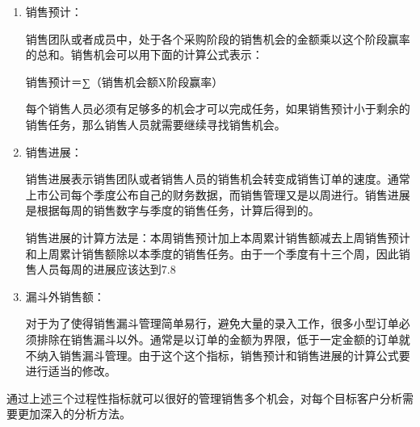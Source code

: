     \begin{enumerate}
        \item 销售预计：

        销售团队或者成员中，处于各个采购阶段的销售机会的金额乘以这个阶段赢率的总和。销售机会可以用下面的计算公式表示：

        销售预计＝∑（销售机会额X阶段赢率）

        每个销售人员必须有足够多的机会才可以完成任务，如果销售预计小于剩余的销售任务，那么销售人员就需要继续寻找销售机会。

        \item 销售进展：

        销售进展表示销售团队或者销售人员的销售机会转变成销售订单的速度。通常上市公司每个季度公布自己的财务数据，而销售管理又是以周进行。销售进展是根据每周的销售数字与季度的销售任务，计算后得到的。

        销售进展的计算方法是：本周销售预计加上本周累计销售额减去上周销售预计和上周累计销售额除以本季度的销售任务。由于一个季度有十三个周，因此销售人员每周的进展应该达到7.8%

        \item 漏斗外销售额：

        对于为了使得销售漏斗管理简单易行，避免大量的录入工作，很多小型订单必须排除在销售漏斗以外。通常是以订单的金额为界限，低于一定金额的订单就不纳入销售漏斗管理。由于这个这个指标，销售预计和销售进展的计算公式要进行适当的修改。
    \end{enumerate}

    通过上述三个过程性指标就可以很好的管理销售多个机会，对每个目标客户分析需要更加深入的分析方法。
